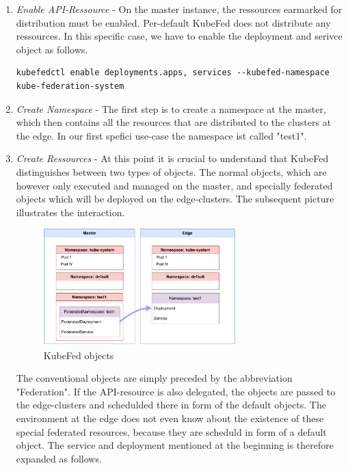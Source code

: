 \documentclass[MSC,Master,english]{twbook}%
\begin{document}
\begin{enumerate}
    \item \textit{Enable API-Ressource} - On the master instance, the ressources earmarked for distribution must be enabled. Per-default KubeFed does not distribute any ressources. In this specific case, we have to enable the deployment and serivce object as follows.
    \begin{lstlisting}[caption={Enable federation},captionpos=b]
        kubefedctl enable deployments.apps, services --kubefed-namespace kube-federation-system
    \end{lstlisting}
    \item \textit{Create Namespace} - The first step is to create a namespace at the master, which then contains all the resources that are distributed to the clusters at the edge. In our first spefici use-case the namespace ist called "test1".
    \item \textit{Create Ressources} - At this point it is crucial to understand that KubeFed distinguishes between two types of objects. The normal objects, which are however only executed and managed on the master, and specially federated objects which will be deployed on the edge-clusters. The subsequent picture illustrates the interaction.
    \begin{figure}[ht]
        \centering
        \includegraphics[width=0.70\textwidth]{PICs/drawio/kubefed-ressources.drawio.pdf}
        \caption{KubeFed objects}
        \label{fig:kubefed-ressources}
    \end{figure} \medbreak
    The conventional objects are simply preceded by the abbreviation "Federation". If the API-resource is also delegated, the objects are passed to the edge-clusters and schedulded there in form of the default objects. The environment at the edge does not even know about the existence of these special federated resources, because they are scheduld in form of a default object. The service and deployment mentioned at the beginning is therefore expanded as follows.

\end{enumerate}
\end{document}
